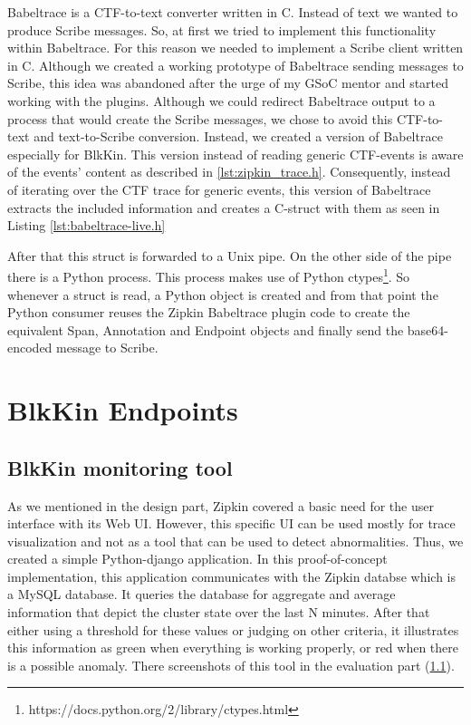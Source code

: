 Babeltrace is a CTF-to-text converter written in C. Instead of text we wanted to
produce Scribe messages. So, at first we tried to implement this functionality
within Babeltrace. For this reason we needed to implement a Scribe client
written in C. Although we created a working prototype of Babeltrace sending
messages to Scribe, this idea was abandoned after the urge of my GSoC mentor and
started working with the plugins. Although we could redirect Babeltrace output
to a process that would create the Scribe messages, we chose to avoid this
CTF-to-text and text-to-Scribe conversion. Instead, we created a version of
Babeltrace especially for BlkKin. This version instead of reading generic
CTF-events is aware of the events' content as described in
\ref{lst:zipkin_trace.h}. Consequently, instead of iterating over the CTF trace
for generic events, this version of Babeltrace extracts the included information
and creates a C-struct with them as seen in Listing \ref{lst:babeltrace-live.h} 


After that this struct is forwarded to a Unix pipe. On the other side of the
pipe there is a Python process. This process makes use of Python
ctypes\footnote{https://docs.python.org/2/library/ctypes.html}. So whenever a
struct is read, a Python object is created and from that point the Python
consumer reuses the Zipkin Babeltrace plugin code to create the equivalent Span,
Annotation and Endpoint objects and finally send the base64-encoded message to
Scribe.

\section{BlkKin Endpoints}

\subsection{BlkKin monitoring tool}
As we mentioned in the design part, Zipkin covered a basic need for the user
interface with its Web UI. However, this specific UI can be used mostly for
trace visualization and not as a tool that can be used to detect abnormalities.
Thus, we created a simple Python-django application. In this proof-of-concept
implementation, this application communicates with the Zipkin databse which is a
MySQL database. It queries the database for aggregate and average information
that depict the cluster state over the last N minutes. After that either using a
threshold for these values or judging on other criteria, it illustrates this
information as green when everything is working properly, or red when there is a
possible anomaly. There screenshots of this tool in the evaluation part
(\ref{}).

